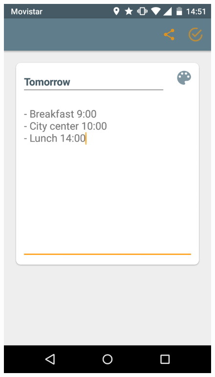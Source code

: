 \begin{itemize}
\clearpage

\begin{figure}[!h]
\centering
\includegraphics[scale=0.12]{Figures/crearNota1.png}

\end{figure}
\end{itemize}
